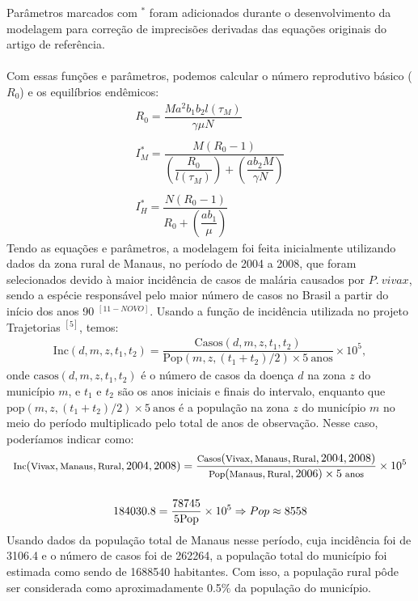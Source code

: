 \documentclass[12pt]{article}
\begin{document}
\vspace{1cm}
Parâmetros marcados com $^*$ foram adicionados durante o desenvolvimento da modelagem para correção de imprecisões derivadas das equações originais do artigo de referência.
\\\\
Com essas funções e parâmetros, podemos calcular o número reprodutivo básico ($R_0$) e os equilíbrios endêmicos:
\begin{gather*}
R_0 = \dfrac{Ma^2b_1b_2l(\tau_M)}{\gamma \mu N} \\
\\
I_M^* = \dfrac{M(R_0-1)}{(\dfrac{R_0}{l(\tau_M)}) + (\dfrac{ab_2M}{\gamma N})} \\
\\
I_H^* = \dfrac{N(R_0-1)}{R_0 + (\dfrac{ab_1}{\mu})}
\end{gather*}
Tendo as equações e parâmetros, a modelagem foi feita inicialmente 
utilizando dados da zona rural de Manaus, no período de 2004 a 2008, 
que foram selecionados devido à maior incidência de casos de malária causados 
por $P. \ vivax$, sendo a espécie responsável pelo maior número de
casos no Brasil a partir do início dos anos 90 $^{[11-NOVO]}$. Usando a função de incidência utilizada no projeto 
Trajetorias $^{[5]}$, temos:
\begin{gather*}
    \text{Inc}(d, m, z, t_1, t_2) = \dfrac{\text{Casos}(d, m, z, t_1, t_2)}{\text{Pop}(m,z,(t_1+t_2)/2) \times 5 \ \text{anos}} \times 10^5,
\end{gather*}
onde $\text{casos}(d, m, z, t_1, t_2)$ é o número de casos da doença $d$ na zona $z$ do município $m$, e $t_1$ e $t_2$ são os anos iniciais e finais do intervalo, enquanto que $\text{pop}(m,z,(t_1+t_2)/2) \times 5 \ \text{anos}$ é a população na zona $z$ do município $m$ no meio do período multiplicado pelo total de anos de observação. Nesse caso, poderíamos indicar como:
\begin{gather*}
    \footnotesize{\text{Inc}(\text{Vivax}, \text{Manaus}, \text{Rural}, 2004, 2008) = \dfrac{\text{Casos}(\text{Vivax}, \text{Manaus}, \text{Rural}, 2004, 2008)}{\text{Pop}(\text{Manaus}, \text{Rural}, 2006) \times 5 \ \text{anos}} \times 10^5}  \\\\
    184030.8 = \dfrac{78745}{5\text{Pop}} \times 10^5 \Rightarrow Pop \approx 8558
\end{gather*}
Usando dados da população total de Manaus nesse período, cuja incidência foi de 3106.4 e o número de casos foi de 262264, a população total do município foi estimada como sendo de 1688540 habitantes. Com isso, a população rural pôde ser considerada como aproximadamente 0.5$\%$ da população do município.
\end{document}
